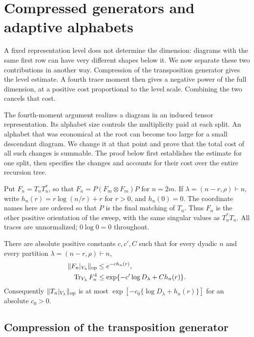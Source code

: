 \section{Compressed generators and adaptive alphabets}
\label{rec:sec-adaptive}

A fixed representation level does not determine the dimension: diagrams
with the same first row can have very different shapes below it.  We now
separate these two contributions in another way.  Compression of the
transposition generator gives the level estimate.  A fourth trace moment
then gives a negative power of the full dimension, at a positive cost
proportional to the level scale.  Combining the two cancels that cost.

The fourth-moment argument realizes a diagram in an induced tensor
representation.  Its alphabet size controls the multiplicity paid at each
split.  An alphabet that was economical at the root can become too large
for a small descendant diagram.  We change it at that point and prove that
the total cost of all such changes is summable.  The proof below first
establishes the estimate for one split, then specifies the changes and
accounts for their cost over the entire recursion tree.

Put $F_n=T_nT_n^*$, so that
$F_n=P(F_m\otimes F_m)P$ for $n=2m$.  If
$\lambda=(n-r,\rho)\vdash n$, write
$h_n(r)=r\log(n/r)+r$ for $r>0$, and $h_n(0)=0$.
The coordinate names here are ordered so that $P$ is the final matching
of $T_n$.  Thus $F_n$ is the other positive orientation of the sweep,
with the same singular values as $T_n^*T_n$.  All traces are unnormalized;
$0\log0=0$ throughout.

\begin{theorem}\label{rec:adaptive-main}
There are absolute positive constants $c,c',C$ such that for every
dyadic $n$ and every partition $\lambda=(n-r,\rho)\vdash n$,
\begin{align}
 \|F_n|_{V_\lambda}\|_{\mathrm{op}}&\le e^{-c h_n(r)},
       \label{rec:generator-level-main}\\
 \operatorname{Tr}_{V_\lambda}F_n^4&\le
       \exp\{-c'\log D_\lambda+C h_n(r)\}.
       \label{rec:adaptive-trace-main}
\end{align}
Consequently $\|T_n|_{V_\lambda}\|_{\mathrm{op}}$ is at most
$\exp[-c_0\{\log D_\lambda+h_n(r)\}]$ for an absolute $c_0>0$.
\end{theorem}

\subsection{Compression of the transposition generator}


